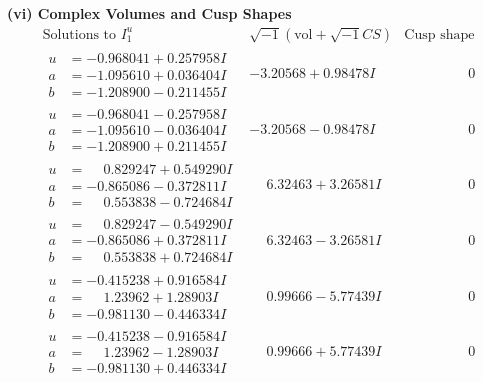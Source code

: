 \documentclass[1p]{elsarticle_modified}
\theoremstyle{definition}
\newcommand{\I}{\sqrt{-1}}
\begin{document}
\newpage\flushleft \textbf{(vi) Complex Volumes and Cusp Shapes}
$$\begin{array}{c|c|c}  
\text{Solutions to }I^u_{1}& \I (\text{vol} + \sqrt{-1}CS) & \text{Cusp shape}\\
 \hline 
\begin{aligned}
u &= -0.968041 + 0.257958 I \\
a &= -1.095610 + 0.036404 I \\
b &= -1.208900 - 0.211455 I\end{aligned}
 & -3.20568 + 0.98478 I & \phantom{-0.000000 } 0 \\ \hline\begin{aligned}
u &= -0.968041 - 0.257958 I \\
a &= -1.095610 - 0.036404 I \\
b &= -1.208900 + 0.211455 I\end{aligned}
 & -3.20568 - 0.98478 I & \phantom{-0.000000 } 0 \\ \hline\begin{aligned}
u &= \phantom{-}0.829247 + 0.549290 I \\
a &= -0.865086 - 0.372811 I \\
b &= \phantom{-}0.553838 - 0.724684 I\end{aligned}
 & \phantom{-}6.32463 + 3.26581 I & \phantom{-0.000000 } 0 \\ \hline\begin{aligned}
u &= \phantom{-}0.829247 - 0.549290 I \\
a &= -0.865086 + 0.372811 I \\
b &= \phantom{-}0.553838 + 0.724684 I\end{aligned}
 & \phantom{-}6.32463 - 3.26581 I & \phantom{-0.000000 } 0 \\ \hline\begin{aligned}
u &= -0.415238 + 0.916584 I \\
a &= \phantom{-}1.23962 + 1.28903 I \\
b &= -0.981130 - 0.446334 I\end{aligned}
 & \phantom{-}0.99666 - 5.77439 I & \phantom{-0.000000 } 0 \\ \hline\begin{aligned}
u &= -0.415238 - 0.916584 I \\
a &= \phantom{-}1.23962 - 1.28903 I \\
b &= -0.981130 + 0.446334 I\end{aligned}
 & \phantom{-}0.99666 + 5.77439 I & \phantom{-0.000000 } 0 \\ \hline\begin{aligned}

\end{aligned}
\end{array}$$
\end{document}
